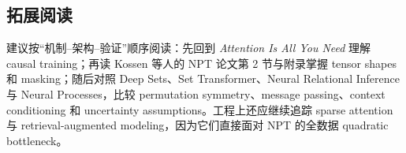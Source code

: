 \documentclass[a4paper]{article}
\begin{document}
\subsection{拓展阅读}

建议按“机制--架构--验证”顺序阅读：先回到 \emph{Attention Is All You Need} 理解 causal training；再读 Kossen 等人的 NPT 论文第 2 节与附录掌握 tensor shapes 和 masking；随后对照 Deep Sets、Set Transformer、Neural Relational Inference 与 Neural Processes，比较 permutation symmetry、message passing、context conditioning 和 uncertainty assumptions。工程上还应继续追踪 sparse attention 与 retrieval-augmented modeling，因为它们直接面对 NPT 的全数据 quadratic bottleneck。

\end{document}
